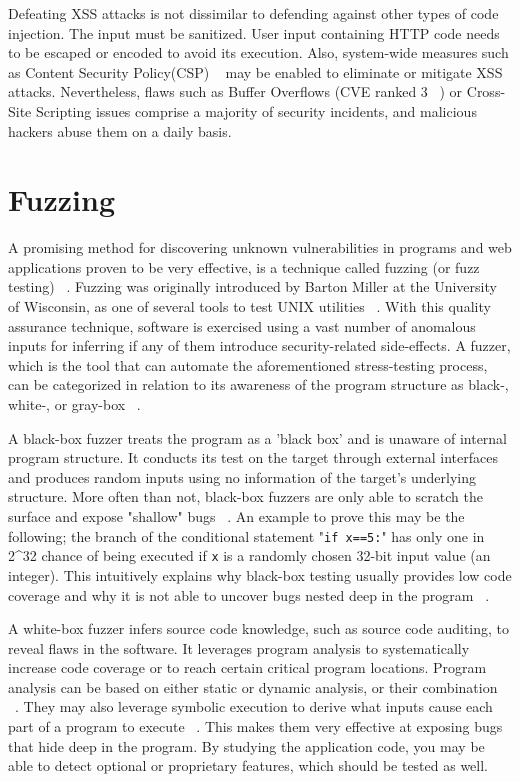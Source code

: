 Defeating XSS attacks is not dissimilar to defending against other types of code injection.
The input must be sanitized. User input containing HTTP code needs to be escaped or encoded to avoid its execution. Also, system-wide measures such as Content Security Policy(CSP) ~\cite{csp_def} may be enabled to eliminate or mitigate XSS attacks. Nevertheless, flaws such as Buffer Overflows (CVE ranked 3 ~\cite{cve}) or Cross-Site Scripting issues comprise a majority of security incidents, and malicious hackers abuse them on a daily basis. 

\section{Fuzzing}
A promising method for discovering unknown vulnerabilities in programs and web applications proven to be very effective, is a technique called fuzzing (or fuzz testing) ~\cite{fuzzing_def}. Fuzzing was originally introduced by Barton Miller at the University of Wisconsin, as one of several tools to test UNIX utilities ~\cite{mller1990fuzz}. With this quality assurance technique, software is exercised using a vast number of anomalous inputs for inferring if any of them introduce security-related side-effects. A fuzzer, which is the tool that can automate the aforementioned stress-testing process, can be categorized in relation to its awareness of the program structure as black-, white-, or gray-box ~\cite{fuzzing_book}. 

A black-box fuzzer treats the program as a 'black box' and is unaware of internal program structure. It conducts its test on the target through external interfaces and produces random inputs using no information of the target's underlying structure. More often than not, black-box fuzzers are only able to scratch the surface and expose "shallow" bugs ~\cite{fuzzing_owasp}. An example to prove this may be the following; the branch of the conditional statement "{\tt if x==5:}" has only one in 2^32 chance of being executed if {\tt x} is a randomly chosen 32-bit input value (\ie an integer). This intuitively explains why black-box testing usually provides low code coverage and why it is not able to uncover bugs nested deep in the program ~\cite{Godefroid2008AutomatedWF}.

A white-box fuzzer infers source code knowledge, such as source code auditing, to reveal
flaws in the software. It leverages program analysis to systematically
increase code coverage or to reach certain critical program locations. Program analysis can be based on either static or dynamic analysis, or their combination ~\cite{program_analysis_book}. They may also leverage symbolic execution to derive what inputs cause each part of a program to execute ~\cite{king1976symoblic}. This makes them very effective at exposing bugs that hide deep in the program. By studying the application code, you may be able to detect optional or proprietary features, which should be tested as well.

